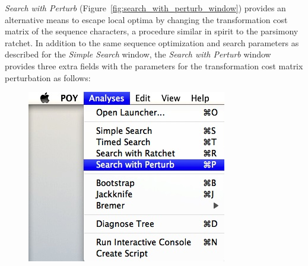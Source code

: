 {\emph{Search with Perturb} (Figure~\ref{fig:search_with_perturb_window}) provides an alternative means to escape local 
optima by changing the transformation cost matrix of the sequence characters, a procedure similar in spirit to the parsimony 
ratchet. In addition to the same sequence optimization and search parameters as described for the \emph{Simple Search} 
window, the \emph{Search with Perturb} window provides three extra fields with the parameters for the
transformation cost matrix perturbation as follows:

\begin{figure}
\centering
\begin{minipage}[c]{0.45\textwidth}
   		\includegraphics[width=\textwidth]{doc/figures/searchwithperturb_menu.jpg}
\end{minipage}
\,
\begin{minipage}[c]{0.52\textwidth}

\end{minipage}
\end{figure}}
